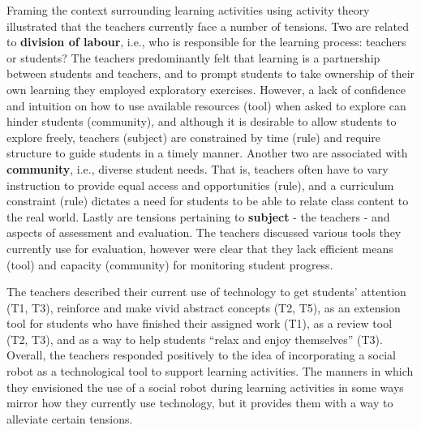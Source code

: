 Framing the context surrounding learning activities using activity theory illustrated that the teachers currently face a number of tensions. Two are related to \textbf{division of labour}, i.e., who is responsible for the learning process: teachers or students? The teachers predominantly felt that learning is a partnership between students and teachers, and to prompt students to take ownership of their own learning they employed exploratory exercises. However, a lack of confidence and intuition on how to use available resources (tool) when asked to explore can hinder students (community), and although it is desirable to allow students to explore freely, teachers (subject) are constrained by time (rule) and require structure to guide students in a timely manner. Another two are associated with \textbf{community}, i.e., diverse student needs. That is, teachers often have to vary instruction to provide equal access and opportunities (rule), and a curriculum constraint (rule) dictates a need for students to be able to relate class content to the real world. Lastly are tensions pertaining to \textbf{subject} - the teachers - and aspects of assessment and evaluation. The teachers discussed various tools they currently use for evaluation, however were clear that they lack efficient means (tool) and capacity (community) for monitoring student progress.


The teachers described their current use of technology to get students' attention (T1, T3), reinforce and make vivid abstract concepts (T2, T5), as an extension tool for students who have finished their assigned work (T1), as a review tool (T2, T3), and as a way to help students ``relax and enjoy themselves'' (T3). Overall, the teachers responded positively to the idea of incorporating a social robot as a technological tool to support learning activities. The manners in which they envisioned the use of a social robot during learning activities in some ways mirror how they currently use technology, but it provides them with a way to alleviate certain tensions.  


